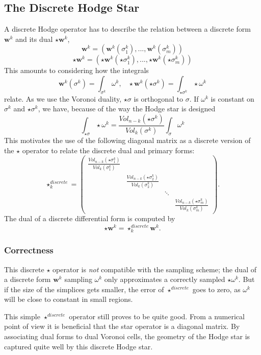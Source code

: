 \subsection{The Discrete Hodge Star}
A discrete Hodge operator has to describe the relation between a discrete form $\textbf{w}^k$ and its dual $\star \textbf{w}^k$, 
\[\textbf{w}^k = (\textbf{w}^k(\sigma^k_1),...,\textbf{w}^k(\sigma^k_m))\]
\[\star\textbf{w}^k  = (\star\textbf{w}^k(\star\sigma^k_1),...,\star\textbf{w}^k(\star\sigma^k_m))\]
This amounts to considering how the integrals
\[\textbf{w}^k(\sigma^k) =\int_{\sigma^k} \omega^k ,\;\;\; \star\textbf{w}^k(\star\sigma^k) = \int_{\star \sigma^k} \star \omega^k\]
relate. As we use the Voronoi duality, $\star \sigma$ is orthogonal to $\sigma$. If $\omega^k$ is constant on $\sigma^k$ and $\star \sigma^k$, we have, because of the way the Hodge star is designed
\[\int_{\star\sigma} \star\omega^k =  \frac{Vol_{n-k}(\star \sigma^k)}{Vol_k(\sigma^k)}\int_{\sigma} \omega^k\]
This motivates the use of the following diagonal matrix as a discrete version of the $\star$ operator to relate the discrete dual and primary forms:
\[\star^{discrete}_k = \begin{pmatrix}
\frac{Vol_{n-k}(\star \sigma^k_1)}{Vol_k(\sigma_1^k)} \\
&\frac{Vol_{n-k}(\star \sigma_2^k)}{Vol_k(\sigma_2^k)} \\
& & \ddots \\
& & & \frac{Vol_{n-k}(\star \sigma_m^k)}{Vol_k(\sigma_m^k)}
\end{pmatrix}.\]
The dual of a discrete differential form is computed by
\[\star \textbf{w}^k = \star^{discrete}_k \textbf{w}^k.\]

\subsubsection{Correctness}
This discrete $\star$ operator is \emph{not} compatible with the sampling scheme; the dual of a discrete form $\textbf{w}^k$ sampling $\omega^k$ only approximates a correctly sampled $\star \omega^k$. But if the size of the simplices gets smaller, the error of $\star^{discrete}$ goes to zero, as $\omega^k$ will be close to constant in small regions.

This simple $\star^{discrete}$ operator still proves to be quite good. From a numerical point of view it is beneficial that the star operator is a diagonal matrix. By associating dual forms to dual Voronoi cells, the geometry of the Hodge star is captured quite well by this discrete Hodge star. 

